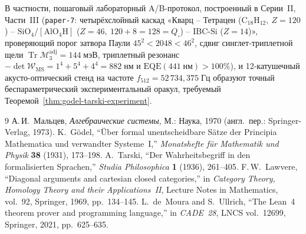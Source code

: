 \documentclass[11pt,a4paper]{article}
\theoremstyle{definition}
\theoremstyle{remark}
\begin{document}
В частности, пошаговый лабораторный A/B-протокол, построенный в Серии~II, Части~III (\texttt{paper-7}: четырёхслойный каскад «Кварц -- Тетрацен ($\mathrm{C_{18}H_{12}},\ Z=120$) -- $\mathrm{SiO_4}/[\mathrm{AlO_4H}]$ ($Z=46,\ 120+8=128=Q_\square$) -- IBC-$\mathrm{Si}$ ($Z=14$)», проверяющий порог затвора Паули $45^2 < 2048 < 46^2$, сдвиг синглет-триплетной щели $\operatorname{Tr}\mathcal{M}_3^{\mathrm{adj}} = 144\;\text{мэВ}$, триплетный резонанс $-\det\mathcal{W}_{\mathrm{MS}} = 1^4+5^4+4^4 = 882\;\text{нм}$ и $\mathrm{EQE}(441\;\text{нм}) > 100\%$), и 12-катушечный акусто-оптический стенд на частоте $f_{512} = 52\,734{,}375\;\text{Гц}$ образуют точный беспараметрический экспериментальный оракул, требуемый Теоремой~\ref{thm:godel-tarski-experiment}.

\begin{thebibliography}{9}
А.\,И.~Мальцев, \emph{Алгебраические системы}, М.: Наука, 1970 (англ.\ пер.: Springer-Verlag, 1973).
K.~G\"odel, ``\"Uber formal unentscheidbare S\"atze der Principia Mathematica und verwandter Systeme~I,'' \emph{Monatshefte f\"ur Mathematik und Physik} \textbf{38} (1931), 173--198.
A.~Tarski, ``Der Wahrheitsbegriff in den formalisierten Sprachen,'' \emph{Studia Philosophica} \textbf{1} (1936), 261--405.
F.\,W.~Lawvere, ``Diagonal arguments and cartesian closed categories,'' in \emph{Category Theory, Homology Theory and their Applications~II}, Lecture Notes in Mathematics, vol.~92, Springer, 1969, pp.~134--145.
L.~de~Moura and S.~Ullrich, ``The Lean~4 theorem prover and programming language,'' in \emph{CADE~28}, LNCS vol.~12699, Springer, 2021, pp.~625--635.
\end{thebibliography}
\end{document}
